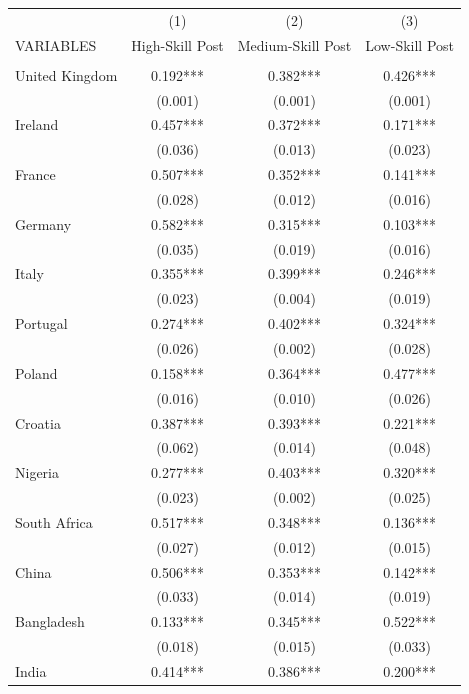 \documentclass[12pt, a4paper]{article}
\begin{document}
\begin{table}[H]
    \centering
        \begin{tabularx}{\textwidth}{@{}lCCC@{}} \hline
         & (1) & (2) & (3) \\
        VARIABLES & High-Skill Post & Medium-Skill Post & Low-Skill Post \\ \hline
         &  &  &  \\
        United Kingdom & 0.192*** & 0.382*** & 0.426*** \\
         & (0.001) & (0.001) & (0.001) \\
        Ireland & 0.457*** & 0.372*** & 0.171*** \\
         & (0.036) & (0.013) & (0.023) \\
        France & 0.507*** & 0.352*** & 0.141*** \\
         & (0.028) & (0.012) & (0.016) \\
        Germany & 0.582*** & 0.315*** & 0.103*** \\
         & (0.035) & (0.019) & (0.016) \\
        Italy & 0.355*** & 0.399*** & 0.246*** \\
         & (0.023) & (0.004) & (0.019) \\
        Portugal & 0.274*** & 0.402*** & 0.324*** \\
         & (0.026) & (0.002) & (0.028) \\
        Poland & 0.158*** & 0.364*** & 0.477*** \\
         & (0.016) & (0.010) & (0.026) \\
        Croatia & 0.387*** & 0.393*** & 0.221*** \\
         & (0.062) & (0.014) & (0.048) \\
        Nigeria & 0.277*** & 0.403*** & 0.320*** \\
         & (0.023) & (0.002) & (0.025) \\
        South Africa & 0.517*** & 0.348*** & 0.136*** \\
         & (0.027) & (0.012) & (0.015) \\
        China & 0.506*** & 0.353*** & 0.142*** \\
         & (0.033) & (0.014) & (0.019) \\
        Bangladesh & 0.133*** & 0.345*** & 0.522*** \\
         & (0.018) & (0.015) & (0.033) \\
        India & 0.414*** & 0.386*** & 0.200*** \\

\end{tabularx}
\end{table}
\end{document}
